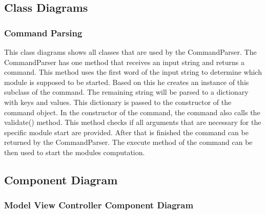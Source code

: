 \documentclass[parskip=full]{scrartcl}
\begin{document}
\newpage

\begin{figure}[h]
\begin{center}

\label{User Input Activity Diagram}
\end{center}
\end{figure}
\newpage

\subsection{Class Diagrams}

\subsubsection{Command Parsing}

This class diagrams shows all classes that are used by the CommandParser.
The CommandParser has one method that receives an input string and returns a command.
This method uses the first word of the input string to determine which module is supposed to be started.
Based on this he creates an instance of this subclass of the command.
The remaining string will be parsed to a dictionary with keys and values. 
This dictionary is passed to the constructor of the command object.
In the constructor of the command, the command also calls the validate() method.
This method checks if all arguments that are necessary for the specific module start are provided.
After that is finished the command can be returned by the CommandParser.
The execute method of the command can be then used to start the modules computation.

\newpage

\begin{figure}[h]
\begin{center}

\label{Command Parsing}
\end{center}
\end{figure}
\newpage

\subsection{Component Diagram}

\subsubsection{Model View Controller Component Diagram}
\end{document}
